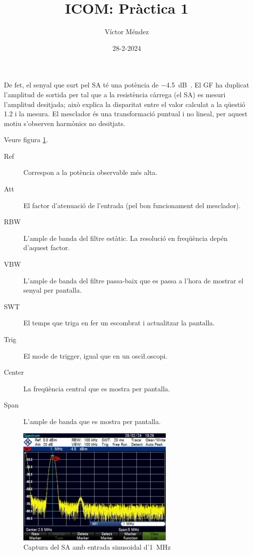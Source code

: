 \documentclass[catalan, a4paper, nobib]{tufte-handout}
\author{Víctor Méndez}
\title{ICOM: Pràctica 1}
\date{28-2-2024}
\begin{document}
\maketitle

 De fet, el senyal que surt pel SA té una potència de \qty[qualifier-mode = combine]{-4.5}{\deci\bel{}}. El GF ha duplicat l'amplitud de sortida per tal que a la resistència càrrega (el SA) es mesuri l'amplitud desitjada; això explica la disparitat entre el valor calculat a la qüestió 1.2 i la mesura. El mesclador és una transformació puntual i no lineal, per aquest motiu s'observen harmònics no desitjats.

 Veure figura \ref{fig:q1}.

\begin{description}
    \item[Ref] Correspon a la potència observable més alta.
    \item[Att] El factor d'atenuació de l'entrada (pel bon funcionament del mesclador).
    \item[RBW] L'ample de banda del filtre estàtic. La resolució en freqüència depén d'aquest factor.
    \item[VBW] L'ample de banda del filtre passa-baix que es passa a l'hora de mostrar el senyal per pantalla.
    \item[SWT] El temps que triga en fer un escombrat i actualitzar la pantalla.
    \item[Trig] El mode de trigger, igual que en un osci\l.oscopi.
    \item[Center] La freqüència central que es mostra per pantalla.
    \item[Span] L'ample de banda que es mostra per pantalla.
\end{description}

\begin{figure}
    \begin{center}
        \includegraphics[width=292px]{q1.png}
        \caption{Captura del SA amb entrada sinusoidal d'\qty{1}{\mega\hertz}}
        \label{fig:q1}
    \end{center}
\end{figure}
\end{document}
